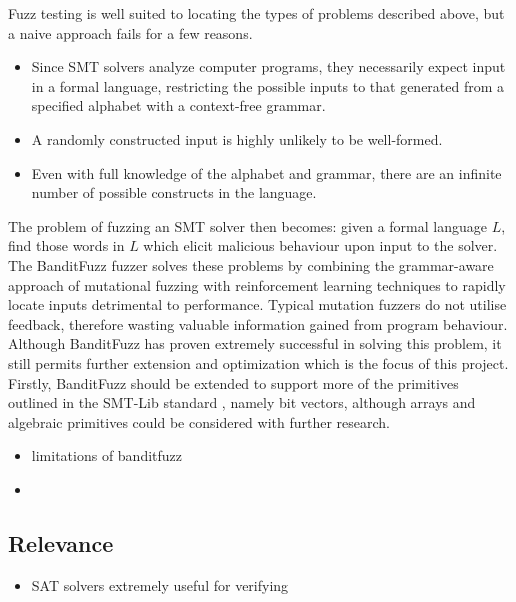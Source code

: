 \documentclass[article,11pt]{article}
\begin{document}
Fuzz testing is well suited to locating the types of problems described above, but a naive approach fails for a few reasons.\\
\begin{itemize}
\item Since SMT solvers analyze computer programs, they necessarily expect input in a formal language, restricting the possible inputs to that generated from a specified alphabet with a context-free grammar.\\
\item A randomly constructed input is highly unlikely to be well-formed.\\
\item Even with full knowledge of the alphabet and grammar, there are an infinite number of possible constructs in the language.\\
\end{itemize}
The problem of fuzzing an SMT solver then becomes: given a formal language \(L\), find those words in \(L\) which elicit malicious behaviour upon input to the solver.\\
The BanditFuzz\cite{bandit} fuzzer solves these problems by combining the grammar-aware approach of mutational fuzzing with reinforcement learning techniques to rapidly locate inputs detrimental to performance. Typical mutation fuzzers do not utilise feedback, therefore wasting valuable information gained from program behaviour.\\
Although BanditFuzz has proven extremely successful in solving this problem, it still permits further extension and optimization which is the focus of this project.\\
Firstly, BanditFuzz should be extended to support more of the primitives outlined in the SMT-Lib standard \cite{SMT}, namely bit vectors, although arrays and algebraic primitives could be considered with further research.\\

\begin{itemize}
\item limitations of banditfuzz\\
\item 
\end{itemize}

\subsection*{Relevance}
\label{sec:org18fc5a6}
\begin{itemize}
\item SAT solvers extremely useful for verifying\\
\end{itemize}
\end{document}
